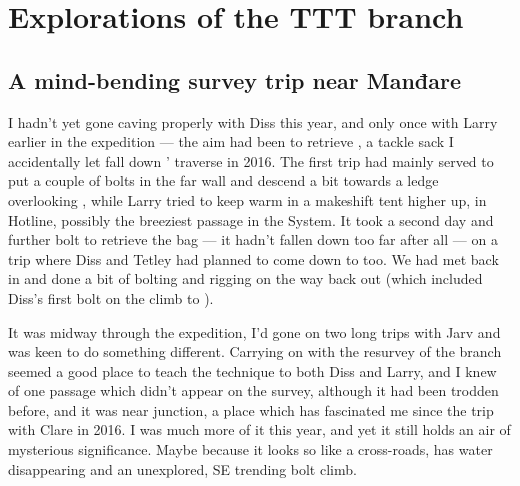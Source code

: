 \section{Explorations of the TTT branch}

\begin{marginfigure}
\end{marginfigure}
\subsection{A mind-bending survey trip near Manđare}
	I hadn't yet gone caving properly with Diss this year, and only once with Larry earlier in the expedition --- the aim had been to retrieve , a tackle sack I accidentally let fall down ' traverse in 2016. The first trip had mainly served to put a couple of bolts in the far wall and descend a bit towards a ledge overlooking , while Larry tried to keep warm in a makeshift tent higher up, in Hotline, possibly the breeziest passage in the System. It took a second day and further bolt to retrieve the bag --- it hadn't fallen down too far after all --- on a trip where Diss and Tetley had planned to come down to  too. We had met back in  and done a bit of bolting and rigging on the way back out (which included Diss's first bolt on the climb to ).
	
	It was midway through the expedition, I'd gone on two long trips with Jarv and was keen to do something different. Carrying on with the resurvey of the  branch seemed a good place to teach the technique to both Diss and Larry, and I knew of one passage which didn't appear on the survey, although it had been trodden before, and it was near  junction, a place which has fascinated me since the trip with Clare in 2016. I was much more of it this year, and yet it still holds an air of mysterious significance. Maybe because it looks so like a cross-roads, has water disappearing and an unexplored, SE trending bolt climb. 
	

